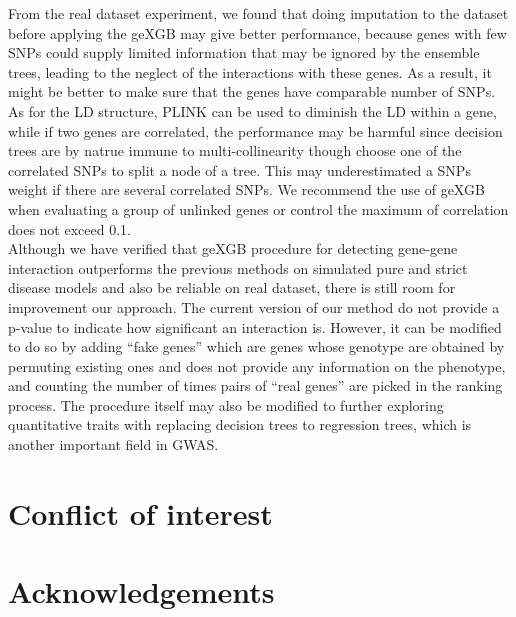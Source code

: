 \documentclass[11pt]{article}
\theoremstyle{plain}
\theoremstyle{definition}
\theoremstyle{remark}
\begin{document}
From the real dataset experiment, we found that doing imputation to the dataset before applying the geXGB may give better performance, because genes with few SNPs could supply limited information that may be ignored by the ensemble trees, leading to the neglect of the interactions with these genes. As a result, it might be better to make sure that the genes have comparable number of SNPs. As for the LD structure, PLINK can be used to diminish the LD within a gene, while if two genes are correlated, the performance may be harmful since decision trees are by natrue immune to multi-collinearity though choose one of the correlated SNPs to split a node of a tree. This may underestimated a SNPs weight if there are several correlated SNPs. We recommend the use of geXGB when evaluating a group of unlinked genes or control the maximum of correlation does not exceed 0.1.\\

Although we have verified that geXGB procedure for detecting gene-gene interaction outperforms the previous methods on simulated pure and strict disease models and also be reliable on real dataset, there is still room for improvement our approach. The current version of our method do not provide a p-value to indicate how significant an interaction is. However, it can be modified to do so by adding ``fake genes'' which are genes whose genotype are obtained by permuting existing ones and does not provide any information on the phenotype, and counting the number of times pairs of ``real genes'' are picked in the ranking process. The procedure itself may also be modified to further exploring quantitative traits with replacing decision trees to regression trees, which is another important field in GWAS.


\section{Conflict of interest}

\section{Acknowledgements}
\end{document}
